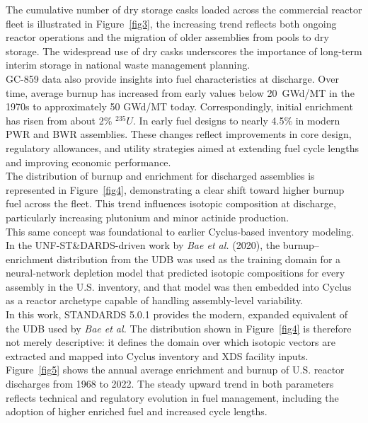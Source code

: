     The cumulative number of dry storage casks loaded across the commercial reactor fleet is illustrated in Figure~\ref{fig3},
    the increasing trend reflects both ongoing reactor operations and the migration of older assemblies from pools to dry storage.
    The widespread use of dry casks underscores the importance of long-term interim storage in national waste management planning.\\

    GC-859 data also provide insights into fuel characteristics at discharge. Over time, average burnup has increased from
    early values below 20~GWd/MT in the 1970s to approximately 50 GWd/MT today. Correspondingly, initial enrichment has
    risen from about 2\% $^{235}U$. In early fuel designs to nearly 4.5\% in modern \gls{PWR} and \gls{BWR} assemblies. These changes reflect
    improvements in core design, regulatory allowances, and utility strategies aimed at extending fuel cycle lengths and
    improving economic performance\cite{sassani_-line_2016}.\\

    The distribution of burnup and enrichment for discharged assemblies is represented in Figure~\ref{fig4}, demonstrating a clear shift toward
    higher burnup fuel across the fleet. This trend influences isotopic composition at discharge, particularly increasing
    plutonium and minor actinide production.\\

    This same concept was foundational to earlier Cyclus-based inventory modeling. In the UNF-ST\&DARDS-driven work by \textit{Bae et al.} (2020)\cite{bae_deep_2020},
    the burnup–enrichment distribution from the \gls{UDB} was used as the training domain for a neural-network depletion model that predicted
    isotopic compositions for every assembly in the U.S. inventory, and that model was then embedded into Cyclus as a reactor archetype
    capable of handling assembly-level variability.\\
    
    In this work, STANDARDS 5.0.1 provides the modern, expanded equivalent of the UDB
    used by \textit{Bae et al.}
    The distribution shown in Figure~\ref{fig4} is therefore not merely descriptive: it defines the domain over which isotopic
    vectors are extracted and mapped into Cyclus inventory and \gls{XDS} facility inputs.\\

    Figure~\ref{fig5} shows the annual average enrichment and burnup of U.S. reactor discharges from
    1968 to 2022. The steady upward trend in both parameters reflects technical and regulatory evolution in fuel management,
    including the adoption of higher enriched fuel and increased cycle lengths.\\


